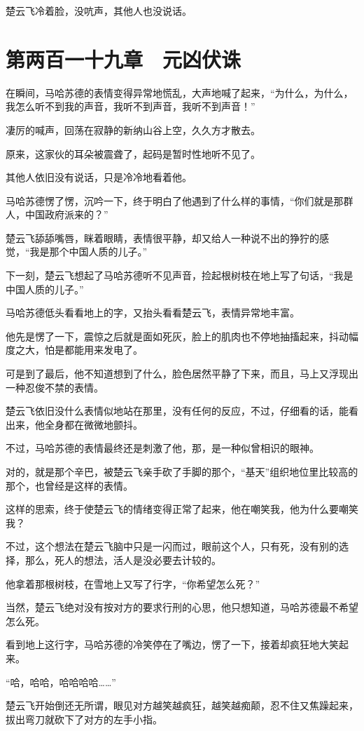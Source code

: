 楚云飞冷着脸，没吭声，其他人也没说话。

\section{第两百一十九章　元凶伏诛}

在瞬间，马哈苏德的表情变得异常地慌乱，大声地喊了起来，“为什么，为什么，我怎么听不到我的声音，我听不到声音，我听不到声音！”

凄厉的喊声，回荡在寂静的新纳山谷上空，久久方才散去。

原来，这家伙的耳朵被震聋了，起码是暂时性地听不见了。

其他人依旧没有说话，只是冷冷地看着他。

马哈苏德愣了愣，沉吟一下，终于明白了他遇到了什么样的事情，“你们就是那群人，中国政府派来的？”

楚云飞舔舔嘴唇，眯着眼睛，表情很平静，却又给人一种说不出的狰狞的感觉，“我是那个中国人质的儿子。”

下一刻，楚云飞想起了马哈苏德听不见声音，捡起根树枝在地上写了句话，“我是中国人质的儿子。”

马哈苏德低头看看地上的字，又抬头看看楚云飞，表情异常地丰富。

他先是愣了一下，震惊之后就是面如死灰，脸上的肌肉也不停地抽搐起来，抖动幅度之大，怕是都能用来发电了。

可是到了最后，他不知道想到了什么，脸色居然平静了下来，而且，马上又浮现出一种忍俊不禁的表情。

楚云飞依旧没什么表情似地站在那里，没有任何的反应，不过，仔细看的话，能看出来，他全身都在微微地颤抖。

不过，马哈苏德的表情最终还是刺激了他，那，是一种似曾相识的眼神。

对的，就是那个辛巴，被楚云飞亲手砍了手脚的那个，“基天”组织地位里比较高的那个，也曾经是这样的表情。

这样的思索，终于使楚云飞的情绪变得正常了起来，他在嘲笑我，他为什么要嘲笑我？

不过，这个想法在楚云飞脑中只是一闪而过，眼前这个人，只有死，没有别的选择，那么，死人的想法，活人是没必要去计较的。

他拿着那根树枝，在雪地上又写了行字，“你希望怎么死？”

当然，楚云飞绝对没有按对方的要求行刑的心思，他只想知道，马哈苏德最不希望怎么死。

看到地上这行字，马哈苏德的冷笑停在了嘴边，愣了一下，接着却疯狂地大笑起来。

“哈，哈哈，哈哈哈哈……”

楚云飞开始倒还无所谓，眼见对方越笑越疯狂，越笑越痴颠，忍不住又焦躁起来，拔出弯刀就砍下了对方的左手小指。

